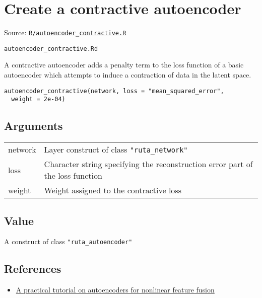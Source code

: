 \section{Create a contractive
autoencoder}\label{create-a-contractive-autoencoder}

Source:
\href{https://github.com/fdavidcl/ruta/blob/master/R/autoencoder_contractive.R}{\texttt{R/autoencoder\_contractive.R}}

\texttt{autoencoder\_contractive.Rd}

A contractive autoencoder adds a penalty term to the loss function of a
basic autoencoder which attempts to induce a contraction of data in the
latent space.

\begin{verbatim}
autoencoder_contractive(network, loss = "mean_squared_error",
  weight = 2e-04)
\end{verbatim}

\hypertarget{arguments}{\subsection{\texorpdfstring{\protect\hyperlink{arguments}{}Arguments}{Arguments}}\label{arguments}}

\begin{longtable}[c]{@{}ll@{}}
\toprule
network & Layer construct of class
\texttt{"ruta\_network"}\tabularnewline
loss & Character string specifying the reconstruction error part of the
loss function\tabularnewline
weight & Weight assigned to the contractive loss\tabularnewline
\bottomrule
\end{longtable}

\hypertarget{value}{\subsection{\texorpdfstring{\protect\hyperlink{value}{}Value}{Value}}\label{value}}

A construct of class \texttt{"ruta\_autoencoder"}

\hypertarget{references}{\subsection{\texorpdfstring{\protect\hyperlink{references}{}References}{References}}\label{references}}

\begin{itemize}
\tightlist
\item
  \href{https://arxiv.org/abs/1801.01586}{A practical tutorial on
  autoencoders for nonlinear feature fusion}
\end{itemize}


